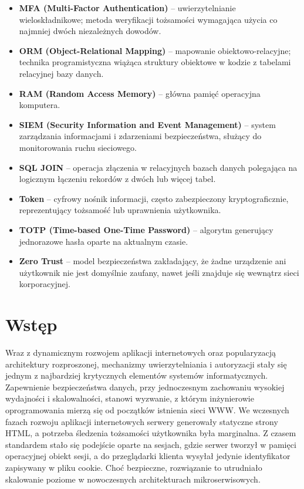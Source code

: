 \documentclass{SGGW-thesis}
\begin{document}
\begin{itemize}
    \item \textbf{MFA (Multi-Factor Authentication)} – uwierzytelnianie wieloskładnikowe; metoda weryfikacji tożsamości wymagająca użycia co najmniej dwóch niezależnych dowodów.
    \item \textbf{ORM (Object-Relational Mapping)} – mapowanie obiektowo-relacyjne; technika programistyczna wiążąca struktury obiektowe w kodzie z tabelami relacyjnej bazy danych.
    \item \textbf{RAM (Random Access Memory)} – główna pamięć operacyjna komputera.
    \item \textbf{SIEM (Security Information and Event Management)} – system zarządzania informacjami i zdarzeniami bezpieczeństwa, służący do monitorowania ruchu sieciowego.
    \item \textbf{SQL JOIN} – operacja złączenia w relacyjnych bazach danych polegająca na logicznym łączeniu rekordów z dwóch lub więcej tabel.
    \item \textbf{Token} – cyfrowy nośnik informacji, często zabezpieczony kryptograficznie, reprezentujący tożsamość lub uprawnienia użytkownika.
    \item \textbf{TOTP (Time-based One-Time Password)} – algorytm generujący jednorazowe hasła oparte na aktualnym czasie.
    \item \textbf{Zero Trust} – model bezpieczeństwa zakładający, że żadne urządzenie ani użytkownik nie jest domyślnie zaufany, nawet jeśli znajduje się wewnątrz sieci korporacyjnej.
\end{itemize}

\clearpage
\tableofcontents
\clearpage

\startchapterfromoddpage
\chapter{Wstęp}

Wraz z dynamicznym rozwojem aplikacji internetowych oraz popularyzacją architektury rozproszonej, mechanizmy uwierzytelniania i autoryzacji stały się jednym z najbardziej krytycznych elementów systemów informatycznych. Zapewnienie bezpieczeństwa danych, przy jednoczesnym zachowaniu wysokiej wydajności i skalowalności, stanowi wyzwanie, z którym inżynierowie oprogramowania mierzą się od początków istnienia sieci WWW. We wczesnych fazach rozwoju aplikacji internetowych serwery generowały statyczne strony HTML, a potrzeba śledzenia tożsamości użytkownika była marginalna. Z czasem standardem stało się podejście oparte na sesjach, gdzie serwer tworzył w pamięci operacyjnej obiekt sesji, a do przeglądarki klienta wysyłał jedynie identyfikator zapisywany w pliku cookie. Choć bezpieczne, rozwiązanie to utrudniało skalowanie poziome w nowoczesnych architekturach mikroserwisowych.
\end{document}
